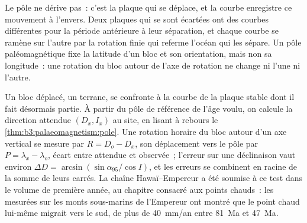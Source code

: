 Le pôle ne dérive pas~: c'est la plaque qui se déplace, et la courbe enregistre
ce mouvement à l'envers. Deux plaques qui se sont écartées ont des courbes
différentes pour la période antérieure à leur séparation, et chaque courbe se
ramène sur l'autre par la rotation finie qui referme l'océan qui les sépare. Un
pôle paléomagnétique fixe la latitude d'un bloc et son orientation, mais non sa
longitude~: une rotation du bloc autour de l'axe de rotation ne change ni l'une ni l'autre.

Un bloc déplacé, un terrane, se confronte à la courbe de la plaque stable dont il
fait désormais partie. À partir du pôle de référence de l'âge voulu, on calcule la
direction attendue $(D_x, I_x)$ au site, en lisant à rebours
le \cref{thm:b3:palaeomagnetism:pole}. Une rotation horaire du bloc autour d'un axe vertical se
mesure par $R = D_o - D_x$, son déplacement vers le pôle par $P = \lambda_x -
\lambda_o$, écart entre  attendue et observée~; l'erreur sur une
déclinaison vaut environ $\Delta D = \arcsin(\sin\alpha_{95}/\cos I)$,
et les erreurs se combinent en racine de la somme de leurs carrés. La chaîne
Hawaï--Empereur a été soumise à ce test dans le volume de première année, au
chapitre consacré aux points chauds~: les  mesurées sur les monts sous-marins de l'Empereur
ont montré que le point chaud lui-même migrait vers le sud, de plus de \qty{40}{mm/an} entre \qty{81}{Ma} et \qty{47}{Ma}.

